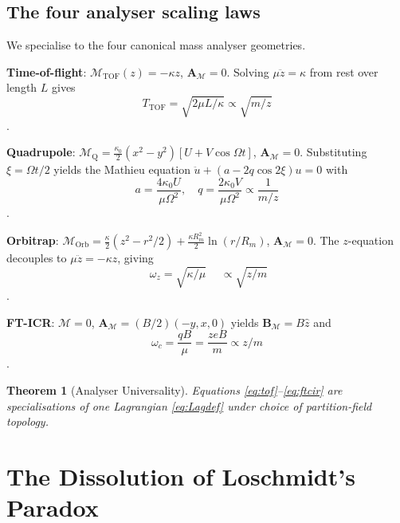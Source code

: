 \documentclass[twocolumn,10pt,a4paper]{article}
\theoremstyle{thmstyle}
\newtheorem{theorem}{Theorem}[section]
\theoremstyle{definition}
\theoremstyle{remark}
\newcommand{\Depth}{\mathcal{M}}
\newcommand{\partinert}{\mu}
\newcommand{\Apartition}{\mathbf{A}_{\Depth}}
\begin{document}
\subsection{The four analyser scaling laws}

We specialise to the four canonical mass analyser geometries.

\textbf{Time-of-flight}: $\Depth_{\mathrm{TOF}}(z)=-\kappa z$,
$\Apartition=0$. Solving $\partinert\ddot z=\kappa$ from rest over
length $L$ gives
\begin{equation}
T_{\mathrm{TOF}}=\sqrt{2\partinert L/\kappa}\propto\sqrt{m/z}
\label{eq:tof}
\end{equation}
\citep{wiley1955}.

\textbf{Quadrupole}: $\Depth_{\mathrm{Q}}=\tfrac{\kappa_{0}}{2}(x^{2}-y^{2})[U+V\cos\Omega t]$,
$\Apartition=0$. Substituting $\xi=\Omega t/2$ yields the Mathieu
equation $\ddot u+(a-2q\cos 2\xi)u=0$ with
\begin{equation}
a=\frac{4\kappa_{0}U}{\partinert\Omega^{2}},\quad
q=\frac{2\kappa_{0}V}{\partinert\Omega^{2}}\propto\frac{1}{m/z}
\label{eq:mathieu}
\end{equation}
\citep{paul1990,march2005}.

\textbf{Orbitrap}: $\Depth_{\mathrm{Orb}}=\tfrac{\kappa}{2}(z^{2}-r^{2}/2)
+\tfrac{\kappa R_{m}^{2}}{2}\ln(r/R_{m})$, $\Apartition=0$. The
$z$-equation decouples to $\partinert\ddot z=-\kappa z$, giving
\begin{equation}
\boxed{\;\omega_{z}=\sqrt{\kappa/\partinert}\;}
\quad\propto\sqrt{z/m}
\label{eq:orb}
\end{equation}
\citep{makarov2000}.

\textbf{FT-ICR}: $\Depth=0$, $\Apartition=(B/2)(-y,x,0)$ yields
$\mathbf{B}_{\Depth}=B\hat z$ and
\begin{equation}
\omega_{c}=\frac{qB}{\partinert}=\frac{zeB}{m}\propto z/m
\label{eq:ftcir}
\end{equation}
\citep{marshall1998}.

\begin{theorem}[Analyser Universality]
\label{thm:univ}
Equations \eqref{eq:tof}--\eqref{eq:ftcir} are specialisations of one
Lagrangian \eqref{eq:Lagdef} under choice of partition-field topology.
\end{theorem}

\section{The Dissolution of Loschmidt's Paradox}
\label{sec:dissolution}
\end{document}
